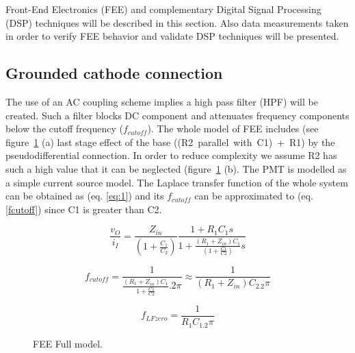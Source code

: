 \documentclass[a4paper, 10pt, oneside, twocolumn, 3p]{elsarticle}
\begin{document}
\par Front-End Electronics (FEE) and complementary Digital Signal Processing (DSP) techniques will be described in this section. Also data measurements taken in order to verify FEE behavior and validate DSP techniques will be presented. 


\subsection{Grounded cathode connection}

\par The use of an AC coupling scheme implies a high pass filter (HPF) will be created. Such a filter blocks DC component and attenuates frequency components below the cutoff frequency ($f_{cutoff}$). The whole model of FEE includes (see figure~\ref{fig:FEE_PMT} (a) last stage effect of the base \mbox{((R2 parallel with C1) + R1)} by the pseudodifferential connection. In order to reduce complexity we assume R2 has such a high value that it can be neglected (figure~\ref{fig:FEE_PMT} (b). The PMT is modelled as a simple current source model. The Laplace transfer function of the whole system can be obtained as (eq. \ref{eq:1}) and its $f_{cutoff}$ can be approximated to (eq. \ref{fcutoff}) since C1 is greater than C2.  


\begin{equation}
\frac{v_O}{i_I} = \frac{Z_{in}}{(1+\frac{C_1}{C_2})}\frac{1+R_1C_1s}{1+\frac{(R_1+Z_{in})C_1}{(1+\frac{C1}{C2})}s} 
\label{eq:1}
\end{equation}


\begin{equation}
f_{cutoff}=\frac{1}{\frac{(R_1+Z_{in})C_1}{1+\frac{C1}{C2}}.2\pi} \approx \frac{1}{(R_1+Z_{in})C_2.2\pi}
\label{fcutoff}
\end{equation}

\begin{equation}
f_{LFzero}=\frac{1}{R_1 C_1.2\pi}
\label{fzero}
\end{equation}


\begin{figure}[!tbp]
	\centering
	\hfill
	\caption{FEE Full model.}
	\label{fig:FEE_PMT}
\end{figure}
\end{document}
